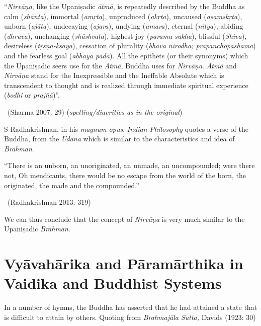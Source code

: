 \begin{myquote}
“\textit{Nirvāṇa}, like the Upaniṣadic \textit{ātmā}, is repeatedly described by the Buddha as calm (\textit{shānta}), immortal (\textit{amṛta}), unproduced (\textit{akṛta}), uncaused (\textit{asamskṛta}), unborn (\textit{ajāta}), undecaying (\textit{ajara}), undying (\textit{amara}), eternal (\textit{nitya}), abiding (\textit{dhruva}), unchanging (\textit{shāshvata}), highest joy (\textit{parama sukha}), blissful (\textit{Shiva}), desireless (\textit{tṛṣṇā-kṣaya}), cessation of plurality (\textit{bhava nirodha; prapanchopashama}) and the fearless goal (\textit{abhaya pada}). All the epithets (or their synonyms) which the Upaniṣadic seers use for the \textit{Ātmā}, Buddha uses for \textit{Nirvāṇa}. \textit{Ātmā} and \textit{Nirvāṇa} stand for the Inexpressible and the Ineffable Absolute which is transcendent to thought and is realized through immediate spiritual experience (\textit{bodhi} or \textit{prajñā})”. 

~\hfill (Sharma 2007: 29) (\textit{spelling/diacritics as in the original})
\end{myquote}

S Radhakrishnan, in his \textit{magnum opus}, \textit{Indian Philosophy} quotes a verse of the Buddha, from the \textit{Udāna} which is similar to the characteristics and idea of \textit{Brahman}.

\begin{myquote}
“There is an unborn, an unoriginated, an unmade, an uncompounded; were there not, Oh mendicants, there would be no escape from the world of the born, the originated, the made and the compounded.” 

~\hfill (Radhakrishnan 2013: 319)
\end{myquote}

We can thus conclude that the concept of \textit{Nirvāṇa} is very much similar to the Upaniṣadic \textit{Brahman}.

\vspace{-.3cm}

\section*{Vyāvahārika and Pāramārthika in Vaidika and Buddhist Systems}

In a number of hymns, the Buddha has asserted that he had attained a state that is difficult to attain by others. Quoting from \textit{Brahmajāla Sutta,} Davids (1923: 30)

